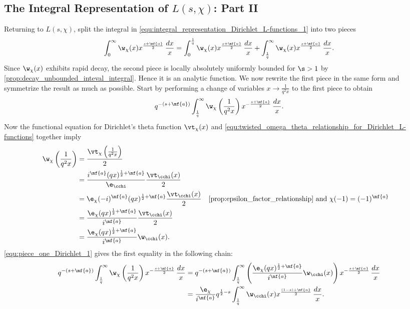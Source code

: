     \subsection*{The Integral Representation of \texorpdfstring{$L(s,\chi)$}{L(s,\chi)}: Part II}
      Returning to $L(s,\chi)$, split the integral in \cref{equ:integral_representation_Dirichlet_L-functions_1} into two pieces
      \begin{equation}\label{equ:symmetric_integral_Dirichlet_L-functions_split}
        \int_{0}^{\infty}\w_{\chi}(x)x^{\frac{s+\mf{a}}{2}}\,\frac{dx}{x} = \int_{0}^{\frac{1}{q}}\w_{\chi}(x)x^{\frac{s+\mf{a}}{2}}\,\frac{dx}{x}+\int_{\frac{1}{q}}^{\infty}\w_{\chi}(x)x^{\frac{s+\mf{a}}{2}}\,\frac{dx}{x}.
      \end{equation}
      Since $\w_{\chi}(x)$ exhibits rapid decay, the second piece is locally absolutely uniformly bounded for $\s > 1$ by \cref{prop:decay_unbounded_inteval_integral}. Hence it is an analytic function. We now rewrite the first piece in the same form and symmetrize the result as much as possible. Start by performing a change of variables $x \to \frac{1}{q^{2}x}$ to the first piece to obtain
      \[
        q^{-(s+\mf{a})}\int_{\frac{1}{q}}^{\infty}\w_{\chi}\left(\frac{1}{q^{2}x}\right)x^{-\frac{s+\mf{a}}{2}}\,\frac{dx}{x}.
      \]
      Now the functional equation for Dirichlet's theta function $\vt_{\chi}(x)$ and \cref{equ:twisted_omega_theta_relationship_for_Dirichlet_L-functions} together imply
      \begin{equation}\label{equ:piece_one_Dirichlet_1}
        \begin{aligned}
          \w_{\chi}\left(\frac{1}{q^{2}x}\right) &= \frac{\vt_{\chi}\left(\frac{1}{q^{2}x}\right)}{2} \\
          &= \frac{i^{\mf{a}}(qx)^{\frac{1}{2}+\mf{a}}}{\e_{\cchi}}\frac{\vt_{\cchi}(x)}{2} \\
          &= \e_{\chi}(-i)^{\mf{a}}(qx)^{\frac{1}{2}+\mf{a}}\frac{\vt_{\cchi}(x)}{2} && \text{\cref{prop:epsilon_factor_relationship} and $\chi(-1) = (-1)^{\mf{a}}$} \\
          &= \frac{\e_{\chi}(qx)^{\frac{1}{2}+\mf{a}}}{i^{\mf{a}}}\frac{\vt_{\cchi}(x)}{2} \\
          &= \frac{\e_{\chi}(qx)^{\frac{1}{2}+\mf{a}}}{i^{\mf{a}}}\w_{\cchi}(x).
        \end{aligned}
      \end{equation}
      \cref{equ:piece_one_Dirichlet_1} gives the first equality in the following chain:
      \begin{align*}
        q^{-(s+\mf{a})}\int_{\frac{1}{q}}^{\infty}\w_{\chi}\left(\frac{1}{q^{2}x}\right)x^{-\frac{s+\mf{a}}{2}}\,\frac{dx}{x} &= q^{-(s+\mf{a})}\int_{\frac{1}{q}}^{\infty}\left(\frac{\e_{\chi}(qx)^{\frac{1}{2}+\mf{a}}}{i^{\mf{a}}}\w_{\cchi}(x)\right)x^{-\frac{s+\mf{a}}{2}}\,\frac{dx}{x} \\
        &= \frac{\e_{\chi}}{i^{\mf{a}}}q^{\frac{1}{2}-s}\int_{\frac{1}{q}}^{\infty}\w_{\cchi}(x)x^{\frac{(1-s)+\mf{a}}{2}}\,\frac{dx}{x}.
      \end{align*}
